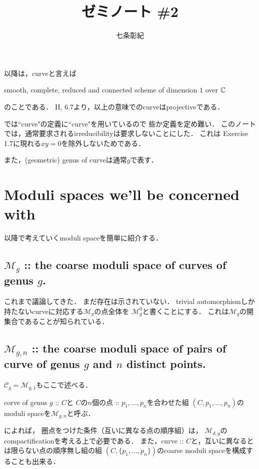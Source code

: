 \documentclass[a4paper]{jsarticle}
\newcommand{\tp}[2]{\texorpdfstring{#1}{#2}}
\newcommand{\modM}{\mathcal{M}}
\newcommand{\modC}{\mathcal{C}}
\begin{document}
\title{ゼミノート \#2}
\author{七条彰紀}
\maketitle
    以降は，curveと言えば
    \begin{center}
        smooth, complete, reduced and connected scheme of dimension $1$ over $\mathbb{C}$
    \end{center}
    のことである．
    \cite{HarAG} II, 6.7より，以上の意味でのcurveはprojectiveである．

    \cite{HaMo}では``curve"の定義に``curve"を用いているので
    些か定義を定め難い．
    このノートでは，通常要求されるirreducibilityは要求しないことにした．
    これは\cite{HaMo} Exercise 1.7に現れる$xy=0$を除外しないためである．

    また，(geometric) genus of curveは通常$g$で表す．

\section{ Moduli spaces we'll be concerned with }
    以降で考えていくmoduli spaceを簡単に紹介する．

    \subsection{\tp{$\modM_g$}{Mg}
        :: the coarse moduli space of curves of genus \tp{$g$}{g}. }
    これまで議論してきた．
    まだ存在は示されていない．
    trivial automorphismしか持たないcurveに対応する$\modM_g$の点全体を
    $\modM_g^0$と書くことにする．
    これは$\modM_g$の開集合であることが知られている．

    \subsection{\tp{$\modM_{g,n}$}{Mgn}
        :: the coarse moduli space of pairs of curve of genus \tp{$g$}{g} and \tp{$n$}{n} distinct points. }
    $\modC_g=\modM_{g,1}$もここで述べる．

    corve of genus $g$ :: $C$と
    $C$の$n$個の点 :: $p_1,\dots, p_n$を合わせた組
    $(C, p_1,\dots, p_n)$のmoduli spaceを$\modM_{g,n}$と呼ぶ．

    \cite{HaMo}によれば，
    圏点をつけた条件（互いに異なる点の順序組）は，
    $\modM_{d,g}$のcompactificationを考える上で必要である．
    また，curve :: $C$と，互いに異なるとは限らない点の順序無し組の組
    $(C, \{p_1,\dots,p_n\})$のcoarse moduli spaceを構成することも出来る．
\end{document}
